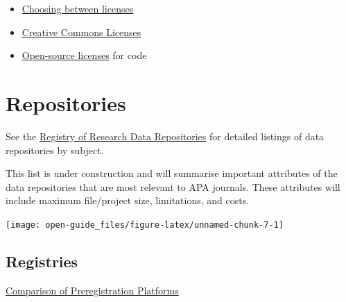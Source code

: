 \documentclass[
  oneside]{book}
\providecommand{\tightlist}{%
  \setlength{\itemsep}{0pt}\setlength{\parskip}{0pt}}
\begin{document}
\begin{itemize}
\tightlist
\item
  \href{http://blog.psyarxiv.com/2018/05/14/licensing-work-psyarxiv/}{Choosing between licenses}
\item
  \href{https://creativecommons.org}{Creative Commons Licenses}
\item
  \href{https://opensource.org/licenses}{Open-source licenses} for code
\end{itemize}

\hypertarget{repositories}{%
\chapter{Repositories}\label{repositories}}

See the \href{https://www.re3data.org/}{Registry of Research Data Repositories} for detailed listings of data repositories by subject.

This list is under construction and will summarise important attributes of the data repositories that are most relevant to APA journals. These attributes will include maximum file/project size, limitations, and costs.

\begin{center}\texttt{[image: open-guide\_files/figure-latex/unnamed-chunk-7-1]} \end{center}

\hypertarget{registries}{%
\section{Registries}\label{registries}}

\href{https://osf.io/preprints/metaarxiv/zry2u}{Comparison of Preregistration Platforms} \citep{haroz_2022}
\end{document}
